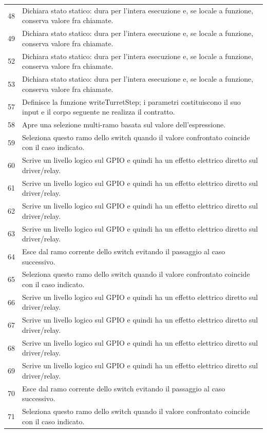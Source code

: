 \documentclass[11pt,a4paper]{article}
\begin{document}
\begin{longtable}{p{}p{}}
48 & Dichiara stato statico: dura per l'intera esecuzione e, se locale a funzione, conserva valore fra chiamate. \\
49 & Dichiara stato statico: dura per l'intera esecuzione e, se locale a funzione, conserva valore fra chiamate. \\
52 & Dichiara stato statico: dura per l'intera esecuzione e, se locale a funzione, conserva valore fra chiamate. \\
53 & Dichiara stato statico: dura per l'intera esecuzione e, se locale a funzione, conserva valore fra chiamate. \\
57 & Definisce la funzione writeTurretStep; i parametri costituiscono il suo input e il corpo seguente ne realizza il contratto. \\
58 & Apre una selezione multi-ramo basata sul valore dell'espressione. \\
59 & Seleziona questo ramo dello switch quando il valore confrontato coincide con il caso indicato. \\
60 & Scrive un livello logico sul GPIO e quindi ha un effetto elettrico diretto sul driver/relay. \\
61 & Scrive un livello logico sul GPIO e quindi ha un effetto elettrico diretto sul driver/relay. \\
62 & Scrive un livello logico sul GPIO e quindi ha un effetto elettrico diretto sul driver/relay. \\
63 & Scrive un livello logico sul GPIO e quindi ha un effetto elettrico diretto sul driver/relay. \\
64 & Esce dal ramo corrente dello switch evitando il passaggio al caso successivo. \\
65 & Seleziona questo ramo dello switch quando il valore confrontato coincide con il caso indicato. \\
66 & Scrive un livello logico sul GPIO e quindi ha un effetto elettrico diretto sul driver/relay. \\
67 & Scrive un livello logico sul GPIO e quindi ha un effetto elettrico diretto sul driver/relay. \\
68 & Scrive un livello logico sul GPIO e quindi ha un effetto elettrico diretto sul driver/relay. \\
69 & Scrive un livello logico sul GPIO e quindi ha un effetto elettrico diretto sul driver/relay. \\
70 & Esce dal ramo corrente dello switch evitando il passaggio al caso successivo. \\
71 & Seleziona questo ramo dello switch quando il valore confrontato coincide con il caso indicato. \\

\end{longtable}
\end{document}
